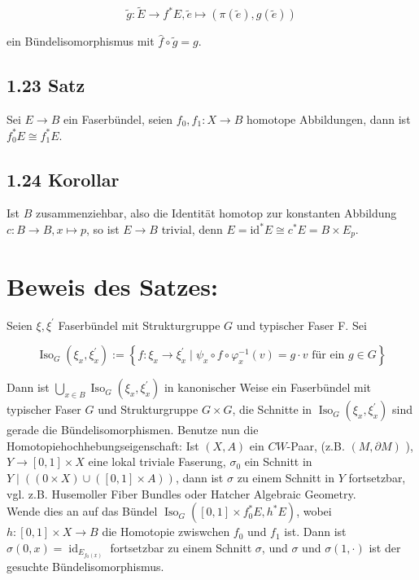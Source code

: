 \documentclass[10pt, letterpaper]{article}
\begin{document}
$$
\tilde{g}: \widetilde{E} \rightarrow f^{*} E, \tilde{e} \mapsto(\pi(\tilde{e}), g(\tilde{e}))
$$

ein Bündelisomorphismus mit $\hat{f} \circ \tilde{g}=g$.

\subsection*{1.23 Satz}
Sei $E \rightarrow B$ ein Faserbündel, seien $f_{0}, f_{1}: X \rightarrow B$ homotope Abbildungen, dann ist $f_{0}^{*} E \cong f_{1}^{*} E$.

\subsection*{1.24 Korollar}
Ist $B$ zusammenziehbar, also die Identität homotop zur konstanten Abbildung $c: B \rightarrow B, x \mapsto p$, so ist $E \rightarrow B$ trivial, denn $E=\mathrm{id}^{*} E \cong c^{*} E=B \times E_{p}$.

\section*{Beweis des Satzes:}
Seien $\xi, \xi^{\prime}$ Faserbündel mit Strukturgruppe $G$ und typischer Faser F. Sei

$$
\operatorname{Iso}_{G}\left(\xi_{x}, \xi_{x}^{\prime}\right):=\left\{f: \xi_{x} \rightarrow \xi_{x}^{\prime} \mid \psi_{x} \circ f \circ \varphi_{x}^{-1}(v)=g \cdot v \text { für ein } g \in G\right\}
$$

Dann ist $\bigcup_{x \in B} \operatorname{Iso}_{G}\left(\xi_{x}, \xi_{x}^{\prime}\right)$ in kanonischer Weise ein Faserbündel mit typischer Faser $G$ und Strukturgruppe $G \times G$, die Schnitte in $\operatorname{Iso}_{G}\left(\xi_{x}, \xi_{x}^{\prime}\right)$ sind gerade die Bündelisomorphismen. Benutze nun die Homotopiehochhebungseigenschaft: Ist $(X, A)$ ein $C W$-Paar, (z.B. $(M, \partial M)$ ), $Y \rightarrow[0,1] \times X$ eine lokal triviale Faserung, $\sigma_{0}$ ein Schnitt in $Y \mid((0 \times X) \cup([0,1] \times A))$, dann ist $\sigma$ zu einem Schnitt in $Y$ fortsetzbar, vgl. z.B. Husemoller Fiber Bundles oder Hatcher Algebraic Geometry.\\
Wende dies an auf das Bündel $\operatorname{Iso}_{G}\left([0,1] \times f_{0}^{*} E, h^{*} E\right)$, wobei $h:[0,1] \times X \rightarrow B$ die Homotopie zwiswchen $f_{0}$ und $f_{1}$ ist. Dann ist $\sigma(0, x)=\operatorname{id}_{E_{f_{0}(x)}}$ fortsetzbar zu einem Schnitt $\sigma$, und $\sigma$ und $\sigma(1, \cdot)$ ist der gesuchte Bündelisomorphismus.
\end{document}
